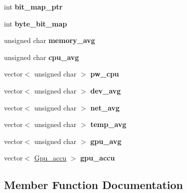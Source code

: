 \begin{DoxyCompactItemize}
int {\bfseries bit\+\_\+map\+\_\+ptr}
\item 
\mbox{\label{classPacked__sample_a4b49acd658c4944b709d49ccf84617de}} 
int {\bfseries byte\+\_\+bit\+\_\+map}
\item 
\mbox{\label{classPacked__sample_a9dade1fad6b011dd8f6b81c38e1db4a5}} 
unsigned char {\bfseries memory\+\_\+avg}
\item 
\mbox{\label{classPacked__sample_adfc0f8f316947f3d0e71070cebf12360}} 
unsigned char {\bfseries cpu\+\_\+avg}
\item 
\mbox{\label{classPacked__sample_a1267c69edfbde4a1fc8711426377e9e4}} 
vector$<$ unsigned char $>$ {\bfseries pw\+\_\+cpu}
\item 
\mbox{\label{classPacked__sample_a5119395999ed7a08224aff910f8cdd43}} 
vector$<$ unsigned char $>$ {\bfseries dev\+\_\+avg}
\item 
\mbox{\label{classPacked__sample_a5a38aca54c18317983e84555bdc34b66}} 
vector$<$ unsigned char $>$ {\bfseries net\+\_\+avg}
\item 
\mbox{\label{classPacked__sample_af3de44069cdcdb84ca9a7276d4636f43}} 
vector$<$ unsigned char $>$ {\bfseries temp\+\_\+avg}
\item 
\mbox{\label{classPacked__sample_aabf7b91d64707c0cfd28b1e39895b895}} 
vector$<$ unsigned char $>$ {\bfseries gpu\+\_\+avg}
\item 
\mbox{\label{classPacked__sample_ac23fc36604ee64c993deeb78127a04ba}} 
vector$<$ \mbox{\hyperlink{structGpu__accu}{Gpu\+\_\+accu}} $>$ {\bfseries gpu\+\_\+accu}
\end{DoxyCompactItemize}


\subsection{Member Function Documentation}
\mbox{\label{classPacked__sample_a09d7b87f1737fa09df7b3e19bf0d728b}} 

